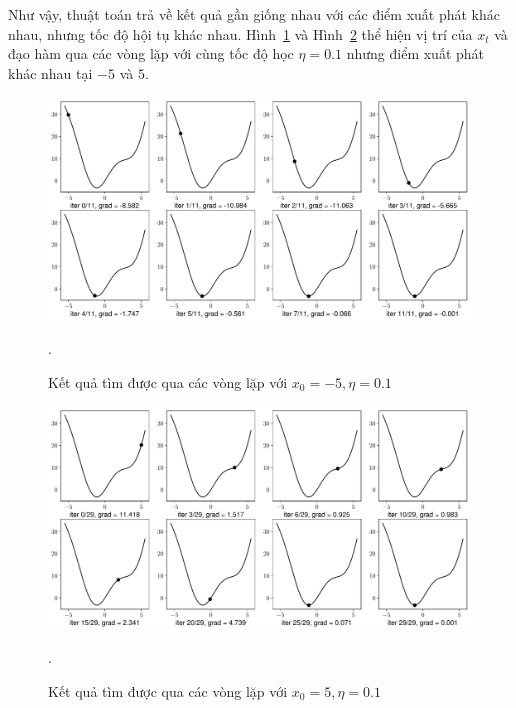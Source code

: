 Như vậy, thuật toán trả về kết quả gần giống nhau với các điểm xuất phát khác
nhau, nhưng tốc độ hội tụ khác nhau. Hình~\ref{fig:7_1} và Hình~\ref{fig:7_2}
thể hiện vị trí của $x_t$ và đạo hàm qua các vòng lặp với cùng tốc độ học $\eta
= 0.1$ nhưng điểm xuất phát khác nhau tại $-5$ và $5$.


\begin{figure}[t]
\centering
\includegraphics[width = \textwidth]{ebookML_src/src/grad_descent/gd1d_0.pdf}
\caption[]{Kết quả tìm được qua các vòng lặp với $x_0 = -5, \eta = 0.1$}.
\label{fig:7_1}
\end{figure}

\begin{figure}[t]
\centering
\includegraphics[width = \textwidth]{ebookML_src/src/grad_descent/gd1d_3.pdf}
\caption[]{Kết quả tìm được qua các vòng lặp với $x_0 = 5, \eta = 0.1$}.
\label{fig:7_2}
\end{figure}



